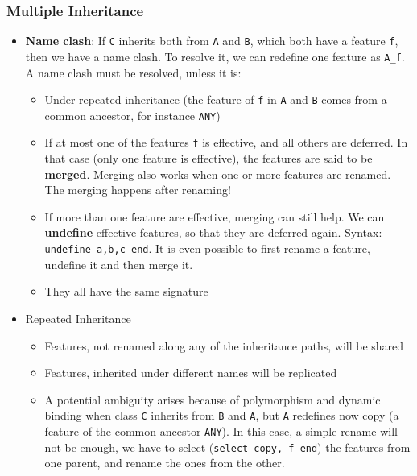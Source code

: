 \documentclass[a4paper]{article}
\newcommand{\inline}[1]{\lstinline!#1!}%
\begin{document}
\subsubsection{Multiple Inheritance}
\begin{itemize}
\item \textbf{Name clash}: If \inline{C} inherits both from \inline{A} and \inline{B}, which both have a feature \inline{f}, then we have a name clash. To resolve it, we can redefine one feature as \inline{A_f}. A name clash must be resolved, unless it is:
\begin{itemize}
\item Under repeated inheritance (the feature of \inline{f} in \inline{A} and \inline{B} comes from a common ancestor, for instance \inline{ANY})
\item If at most one of the features \inline{f} is effective, and all others are deferred. In that case (only one feature is effective), the features are said to be \textbf{merged}. Merging also works when one or more features are renamed. The merging happens after renaming!
\item If more than one feature are effective, merging can still help. We can \textbf{undefine} effective features, so that they are deferred again. Syntax: \inline{undefine a,b,c end}. It is even possible to first rename a feature, undefine it and then merge it. 
\item They all have the same signature
\end{itemize}
\item Repeated Inheritance
\begin{itemize}
\item Features, not renamed along any of the inheritance paths, will be shared
\item Features, inherited under different names will be replicated
\item A potential ambiguity arises because of polymorphism and dynamic binding when class \inline{C} inherits from \inline{B} and \inline{A}, but \inline{A} redefines now copy (a feature of the common ancestor \inline{ANY}). In this case, a simple rename will not be enough, we have to select (\inline{select copy, f end}) the features from one parent, and rename the ones from the other.
\end{itemize}
\end{itemize}
\end{document}
